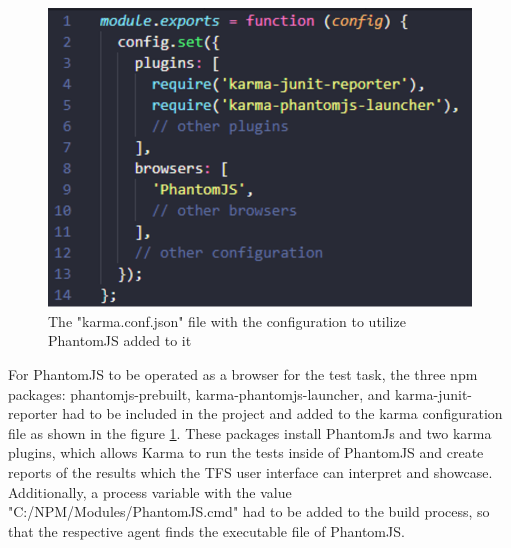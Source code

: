 \documentclass[Bachelor,BIF,english]{twbook}
\begin{document}
\\[\baselineskip]
\begin{figure}[!htbp]
\centering
\includegraphics[width=0.5\linewidth]{PICs/karma_phantomjs.eps}
\caption{The "karma.conf.json" file with the configuration to utilize PhantomJS added to it}\label{Fig3}
\end{figure}
For PhantomJS to be operated as a browser for the test task, the three npm packages: phantomjs-prebuilt, karma-phantomjs-launcher, and karma-junit-reporter had to be included in the project and added to the karma configuration file as shown in the figure \ref{Fig3}. These packages install PhantomJs and two karma plugins, which allows Karma to run the tests inside of PhantomJS and create reports of the results which the TFS user interface can interpret and showcase. Additionally, a process variable with the value "C:/NPM/Modules/PhantomJS.cmd" had to be added to the build process, so that the respective agent finds the executable file of PhantomJS.
\end{document}
